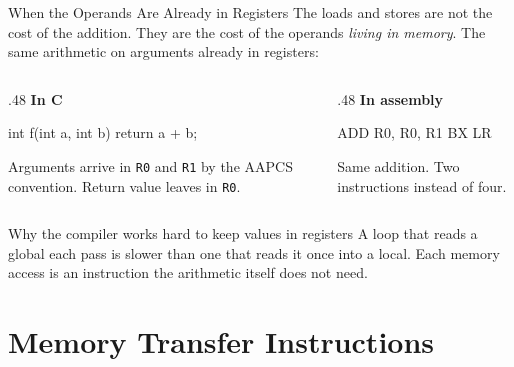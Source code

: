 \documentclass[9pt,aspectratio=169,xcolor=table]{beamer}
\begin{document}
\begin{frame}[fragile]{When the Operands Are Already in Registers}
    \leavevmode
    {\small The loads and stores are not the cost of the addition. They are
    the cost of the operands \emph{living in memory}. The same arithmetic
    on arguments already in registers:}

    \vspace{2mm}
    \begin{columns}[T]
    \begin{column}{.48\textwidth}
        \textbf{In C}

        \vspace{1mm}
        \begin{cc}
int f(int a, int b) {
    return a + b;
}
\end{cc}

        \vspace{2mm}
        {\footnotesize Arguments arrive in \texttt{R0} and \texttt{R1} by
        the AAPCS convention. Return value leaves in \texttt{R0}.}
    \end{column}
    \begin{column}{.48\textwidth}
        \textbf{In assembly}

        \vspace{1mm}
        \begin{asm}[basicstyle=\normalsize\ttfamily]
ADD   R0, R0, R1
BX    LR
\end{asm}

        \vspace{3mm}
        {\small Same addition. \alert{Two instructions} instead of four.}
    \end{column}
    \end{columns}

    \vspace{3mm}
    \begin{block}{Why the compiler works hard to keep values in registers}
        A loop that reads a global each pass is slower than one that reads
        it once into a local. Each memory access is an instruction the
        arithmetic itself does not need.
    \end{block}
\end{frame}


\section{Memory Transfer Instructions}
\end{document}
